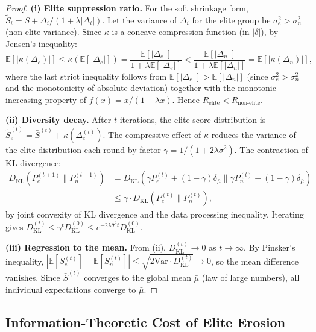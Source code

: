 \documentclass[12pt,a4paper]{article}
\theoremstyle{definition}
\newcommand{\E}{\mathbb{E}}
\newcommand{\Var}{\mathrm{Var}}
\newcommand{\DKL}{D_{\mathrm{KL}}}
\begin{document}
\begin{proof}
\textbf{(i) Elite suppression ratio.} For the soft shrinkage form, $\tilde{S}_i = \bar{S} + \Delta_i/(1+\lambda|\Delta_i|)$. Let the variance of $\Delta_i$ for the elite group be $\sigma_e^2 > \sigma_n^2$ (non-elite variance). Since $\kappa$ is a concave compression function (in $|\delta|$), by Jensen's inequality:
\begin{equation}
    \E[|\kappa(\Delta_e)|] \leq \kappa(\E[|\Delta_e|]) = \frac{\E[|\Delta_e|]}{1 + \lambda\E[|\Delta_e|]} < \frac{\E[|\Delta_n|]}{1 + \lambda\E[|\Delta_n|]} = \E[|\kappa(\Delta_n)|],
\end{equation}
where the last strict inequality follows from $\E[|\Delta_e|] > \E[|\Delta_n|]$ (since $\sigma_e^2 > \sigma_n^2$ and the monotonicity of absolute deviation) together with the monotonic increasing property of $f(x) = x/(1+\lambda x)$. Hence $R_{\text{elite}} < R_{\text{non-elite}}$.

\textbf{(ii) Diversity decay.} After $t$ iterations, the elite score distribution is $\tilde{S}_e^{(t)} = \bar{S}^{(t)} + \kappa(\Delta_e^{(t)})$. The compressive effect of $\kappa$ reduces the variance of the elite distribution each round by factor $\gamma = 1/(1+2\lambda\bar{\sigma}^2)$. The contraction of KL divergence:
\begin{align}
    \DKL(P_e^{(t+1)}\|P_n^{(t+1)}) &= \DKL(\gamma P_e^{(t)} + (1-\gamma)\delta_{\bar{\mu}} \| \gamma P_n^{(t)} + (1-\gamma)\delta_{\bar{\mu}}) \\
    &\leq \gamma \cdot \DKL(P_e^{(t)}\|P_n^{(t)}),
\end{align}
by joint convexity of KL divergence and the data processing inequality. Iterating gives $\DKL^{(t)} \leq \gamma^t \DKL^{(0)} \leq e^{-2\lambda\bar{\sigma}^2 t} \DKL^{(0)}$.

\textbf{(iii) Regression to the mean.} From (ii), $\DKL^{(t)} \to 0$ as $t \to \infty$. By Pinsker's inequality, $|\E[S_e^{(t)}] - \E[S_n^{(t)}]| \leq \sqrt{2\Var \cdot \DKL^{(t)}} \to 0$, so the mean difference vanishes. Since $\bar{S}^{(t)}$ converges to the global mean $\bar{\mu}$ (law of large numbers), all individual expectations converge to $\bar{\mu}$.
\end{proof}

\subsection{Information-Theoretic Cost of Elite Erosion}
\label{sec:info_cost}
\end{document}
